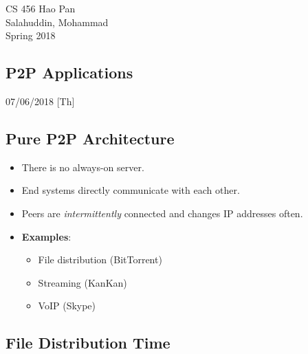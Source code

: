 \documentclass{article}
\begin{document}
\noindent
{CS 456 \hfill Hao Pan}\\
{Salahuddin, Mohammad}\\
{Spring 2018}


\begin{center}
\section{P2P Applications}
\noindent
{\hfill 07/06/2018 [Th]}
\end{center}

\subsection{Pure P2P Architecture}

\begin{itemize}
\item There is no always-on server.
\item End systems directly communicate with each other.
\item Peers are \emph{intermittently} connected and changes IP addresses often.
\item {\bf Examples}:
\begin{itemize}
\item File distribution (BitTorrent)
\item Streaming (KanKan)
\item VoIP (Skype)
\end{itemize}
\end{itemize}

\subsection{File Distribution Time}
\end{document}
